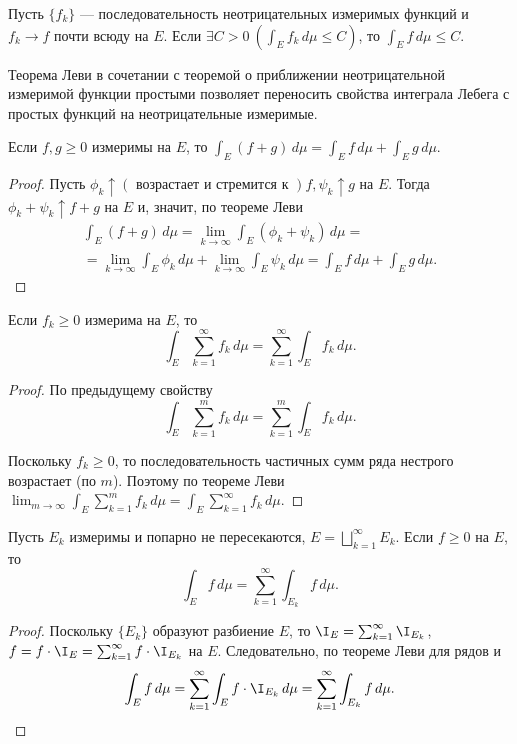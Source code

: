 \begin{problem}
    Пусть $\{f_k\}$ --- последовательность неотрицательных измеримых функций и $f_k \rightarrow f$ почти всюду на $E$. Если $\exists C > 0 \ \left(\int_E f_k \, d\mu \le C\right)$, то $\int_E f\, d\mu \le C$.
\end{problem}

Теорема Леви в сочетании с теоремой о приближении неотрицательной измеримой функции простыми позволяет переносить свойства интеграла Лебега с простых функций на неотрицательные измеримые.

\begin{property}[аддитивность]
    Если $f, g \ge 0$ измеримы на $E$, то $\int_E (f + g) \, d\mu = \int_E f \, d\mu + \int_E g \, d\mu$.

    \begin{proof}
        Пусть $\phi_k \uparrow (\text{ возрастает и стремится к }) f, \psi_k \uparrow g$ на $E$. Тогда $\phi_k + \psi_k \uparrow f + g$ на $E$ и, значит, по теореме Леви
        \begin{gather*}
            \int_E (f + g) \, d\mu = \lim_{k \rightarrow \infty} \int_E (\phi_k + \psi_k) \, d\mu =\\= \lim_{k \rightarrow \infty} \int_E \phi_k \, d\mu + \lim_{k \rightarrow \infty} \int_E \psi_k \, d\mu = \int_E f \, d\mu + \int_E g \, d\mu.
        \end{gather*}
    \end{proof}
\end{property}

\begin{corollary}
    Если $f_k \ge 0$ измерима на $E$, то
    \[
        \int_E \sum_{k = 1}^\infty f_k \, d\mu = \sum_{k = 1}^\infty \int_E f_k \, d\mu.
    \]

    \begin{proof}
        По предыдущему свойству
        \[
            \int_E \sum_{k = 1}^m f_k \, d\mu = \sum_{k = 1}^m \int_E f_k \, d\mu.
        \]

        Поскольку $f_k \ge 0$, то последовательность частичных сумм ряда нестрого возрастает (по $m$). Поэтому по теореме Леви $\lim_{m \rightarrow \infty} \int_E \sum_{k = 1}^m f_k \, d\mu = \int_E \sum_{k = 1}^\infty f_k \, d\mu$.
    \end{proof}
\end{corollary}

\begin{theorem}
    Пусть $E_k$ измеримы и попарно не пересекаются, $E = \bigsqcup_{k = 1}^\infty E_k$. Если $f \ge 0$ на $E$, то
    \[
        \int_E f \, d\mu = \sum_{k = 1}^\infty \int_{E_k} f \, d\mu.
    \]

    \begin{proof}
        Поскольку $\{E_k\}$ образуют разбиение $E$, то $\I_E = \sum_{k = 1}^\infty \I_{E_k}$, $f = f \cdot \I_E = \sum_{k = 1}^\infty f \cdot \I_{E_k}$ на $E$. Следовательно, по теореме Леви для рядов и
        \[
            \int_E f \, d\mu = \sum_{k = 1}^\infty \int_E f \cdot \I_{E_k} \, d\mu = \sum_{k = 1}^\infty \int_{E_k} f \, d\mu.
        \]
    \end{proof}
\end{theorem}


